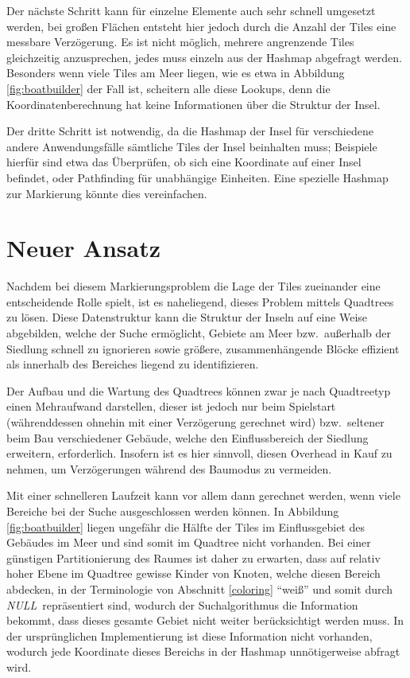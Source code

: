 \documentclass[%
			paper=a4,%
			DIV12,
			liststotoc,
			bibtotoc,
			draft=false,%
			titlepage,
			numbers=noendperiod
			]{scrartcl}
\newcommand{\mynull}{\textit{NULL}}
\begin{document}
Der nächste Schritt kann für einzelne Elemente auch sehr schnell umgesetzt werden, bei großen Flächen entsteht hier jedoch durch die Anzahl der Tiles eine messbare Verzögerung.
Es ist nicht möglich, mehrere angrenzende Tiles gleichzeitig anzusprechen, jedes muss einzeln aus der Hashmap abgefragt werden.
Besonders wenn viele Tiles am Meer liegen, wie es etwa in Abbildung \ref{fig:boatbuilder} der Fall ist, scheitern alle diese Lookups, denn die Koordinatenberechnung hat keine Informationen über die Struktur der Insel.

Der dritte Schritt ist notwendig, da die Hashmap der Insel für verschiedene andere Anwendungsfälle sämtliche Tiles der Insel beinhalten muss; Beispiele hierfür sind etwa das Überprüfen, ob sich eine Koordinate auf einer Insel befindet, oder Pathfinding für unabhängige Einheiten.
Eine spezielle Hashmap zur Markierung könnte dies vereinfachen.

\section{Neuer Ansatz}
Nachdem bei diesem Markierungsproblem die Lage der Tiles zueinander eine entscheidende Rolle spielt, ist es naheliegend, dieses Problem mittels Quadtrees zu lösen.
Diese Datenstruktur kann die Struktur der Inseln auf eine Weise abgebilden,
welche der Suche ermöglicht, Gebiete am Meer bzw.\ außerhalb der Siedlung schnell zu ignorieren sowie größere, zusammenhängende Blöcke effizient als innerhalb des Bereiches liegend zu identifizieren.

Der Aufbau und die Wartung des Quadtrees können zwar je nach Quadtreetyp einen Mehraufwand darstellen, dieser ist jedoch nur beim Spielstart (währenddessen ohnehin mit einer Verzögerung gerechnet wird) bzw.\ seltener beim Bau verschiedener Gebäude, welche den Einflussbereich der Siedlung erweitern, erforderlich.
Insofern ist es hier sinnvoll, diesen Overhead in Kauf zu nehmen, um Verzögerungen während des Baumodus zu vermeiden.

Mit einer schnelleren Laufzeit kann vor allem dann gerechnet werden, wenn viele Bereiche bei der Suche ausgeschlossen werden können.
In Abbildung \ref{fig:boatbuilder} liegen ungefähr die Hälfte der Tiles im Einflussgebiet des Gebäudes im Meer und sind somit im Quadtree nicht vorhanden.
Bei einer günstigen Partitionierung des Raumes ist daher zu erwarten, dass auf relativ hoher Ebene im Quadtree gewisse Kinder von Knoten, welche diesen Bereich abdecken, in der Terminologie von Abschnitt \ref{coloring} "`weiß"' und somit durch \mynull\ repräsentiert sind, wodurch der Suchalgorithmus die Information bekommt, dass dieses gesamte Gebiet nicht weiter berücksichtigt werden muss.
In der ursprünglichen Implementierung ist diese Information nicht vorhanden, wodurch jede Koordinate dieses Bereichs in der Hashmap unnötigerweise abfragt wird.
\end{document}
